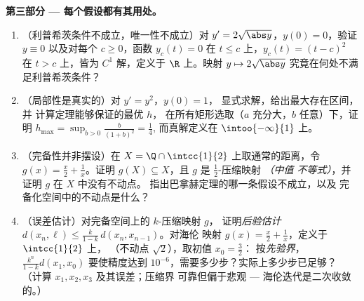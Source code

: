 \begin{problem}
\medskip
\noindent\textbf{第三部分 --- 每个假设都有其用处。}
\begin{enumerate}[resume]
  \item （利普希茨条件不成立，唯一性不成立）对 $y' =
        2\sqrt{\abs y}$，$y(0) = 0$，验证 $y \equiv 0$
        以及对每个 $c \geq 0$，函数 $y_c(t) = 0$ 在
        $t \leq c$ 上，$y_c(t) = (t - c)^2$ 在 $t > c$ 上，皆为
        $C^1$ 解，定义于 $\R$ 上。映射 $y \mapsto
        2\sqrt{\abs y}$ 究竟在何处不满足利普希茨条件？
  \item （局部性是真实的）对 $y' = y^2$，$y(0) = 1$，
        显式求解，给出最大存在区间，并
        计算定理能够保证的最优 $h$，
        在所有矩形选取（$a$ 充分大，$b$ 任意）下，证明
        $h_{\max} = \sup_{b>0} \frac{b}{(1+b)^2} = \frac14$,
        而真解定义在 $\intoo{-\infty}{1}$ 上。
  \item （完备性并非摆设）在 $X = \Q \cap
        \intcc{1}{2}$ 上取通常的距离，令 $g(x) =
        \frac x2 + \frac1x$。证明 $g(X) \subseteq X$，且 $g$
        是 $\frac12$-压缩映射 \emph{（中值
        不等式）}，并证明 $g$ 在 $X$ 中没有不动点。
        指出巴拿赫定理的哪一条假设不成立，以及
        完备化空间中的不动点是什么？
  \item （误差估计）对完备空间上的 $k$-压缩映射 $g$，
        证明\emph{后验估计} $d(x_n,
        \ell) \leq \frac{k}{1-k}\,d(x_n, x_{n-1})$。对海伦
        映射 $g(x) = \frac x2 + \frac 1x$，定义于 $\intcc{1}{2}$ 上，
        （不动点 $\sqrt2$），取初值 $x_0 = \frac32$：
        按\emph{先验界}，
        $\frac{k^n}{1-k}d(x_1, x_0)$ 要使精度达到
        $10^{-6}$，需要多少步？实际上多少步已足够？
        （计算 $x_1, x_2, x_3$ 及其误差；压缩界
        可靠但偏于悲观 ---
        海伦迭代是二次收敛的。）
\end{enumerate}


\end{problem}
